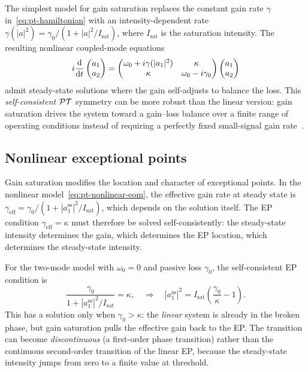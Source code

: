 The simplest model for gain saturation replaces the constant gain rate
$\gamma$ in~\eqref{eq:pt-hamiltonian} with an intensity-dependent rate
$\gamma(|a|^2) = \gamma_0/(1 + |a|^2/I_{\mathrm{sat}})$, where
$I_{\mathrm{sat}}$ is the saturation intensity. The resulting nonlinear
coupled-mode equations
\begin{equation}
 i\frac{\mathop{}\!\mathrm{d} }{\mathop{}\!\mathrm{d} t}\begin{pmatrix} a_1 \\ a_2 \end{pmatrix}
 = \begin{pmatrix}
 \omega_0 + i\gamma(|a_1|^2) & \kappa \\
 \kappa & \omega_0 - i\gamma_0
 \end{pmatrix}
 \begin{pmatrix} a_1 \\ a_2 \end{pmatrix}
 \label{eq:pt-nonlinear-eom}
\end{equation}
admit steady-state solutions where the gain self-adjusts to balance the
loss. This \emph{self-consistent} $\mathcal{PT}$ symmetry can be more robust than
the linear version: gain saturation drives the system toward a
gain--loss balance over a finite range of operating conditions
instead of requiring a perfectly fixed small-signal gain
rate~\cite{longhi2018parity,alexeeva2012optical}.

\subsection{Nonlinear exceptional points}
\label{ssec:nonlinear-ep}

Gain saturation modifies the location and character of exceptional
points. In the nonlinear model~\eqref{eq:pt-nonlinear-eom}, the
effective gain rate at steady state is
$\gamma_{\mathrm{eff}} = \gamma_0/(1 + |a_1^{\mathrm{ss}}|^2/I_{\mathrm{sat}})$,
which depends on the solution itself. The EP condition
$\gamma_{\mathrm{eff}} = \kappa$ must therefore be solved
self-consistently: the steady-state intensity determines the gain, which
determines the EP location, which determines the steady-state intensity.

For the two-mode model with $\omega_0 = 0$ and passive loss $\gamma_0$,
the self-consistent EP condition is
\begin{equation}
 \frac{\gamma_0}{1 + |a_1^{\mathrm{ss}}|^2/I_{\mathrm{sat}}} = \kappa,
 \quad\Rightarrow\quad
 |a_1^{\mathrm{ss}}|^2 = I_{\mathrm{sat}}\left(\frac{\gamma_0}{\kappa} - 1\right).
 \label{eq:nonlinear-ep-condition}
\end{equation}
This has a solution only when $\gamma_0 > \kappa$: the \emph{linear}
system is already in the broken phase, but gain saturation pulls the
effective gain back to the EP. The transition can become
\emph{discontinuous} (a first-order phase transition) rather than the
continuous second-order transition of the linear EP, because the
steady-state intensity jumps from zero to a finite value at threshold.

